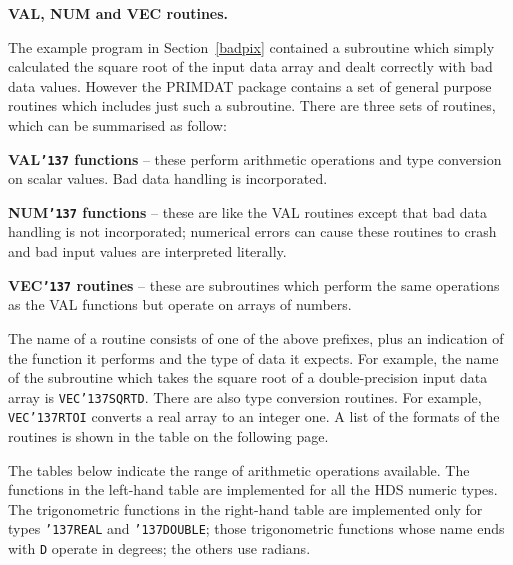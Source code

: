 \documentclass[twoside,11pt]{article}
\renewcommand{\_}{{\tt\char'137}}
\begin{document}
{\bigskip\large\bf VAL, NUM and VEC routines.}

The example program in Section~\ref{badpix} contained a subroutine 
which simply calculated the square root of the input data array and 
dealt correctly with bad data values.
However the PRIMDAT package contains a set of general purpose routines
which includes just such a subroutine.
There are three sets of routines, which can be summarised as follow:
\begin{description}
\item{ \bf VAL\_ functions} -- these perform arithmetic operations and type 
conversion on scalar values. Bad data handling is incorporated.
\item{\bf NUM\_ functions} -- these are like the VAL routines except that bad 
data handling is not incorporated; numerical errors can cause these 
routines to crash and bad input values are interpreted literally. 
\item{\bf VEC\_ routines} -- these are subroutines which perform the
same operations as the VAL functions but operate on arrays of numbers.
\end{description}

The name of a routine consists of one of the above prefixes, plus an 
indication of the function it performs and the type of data it expects.
For example, the name of the subroutine which takes the square root of a
double-precision input data array is {\tt VEC\_SQRTD}.
There are also type conversion routines. For example, {\tt VEC\_RTOI}
converts a real array to an integer one.
A list of the formats of the routines is shown in the table on the following 
page.

The tables below indicate the range of arithmetic operations available.
The functions in the left-hand table are implemented for all the HDS 
numeric types.
The trigonometric functions in the right-hand table are implemented only 
for types {\tt\_REAL} and {\tt\_DOUBLE}; those trigonometric 
functions whose name 
ends with {\tt D} operate in degrees; the others use radians.
\end{document}
